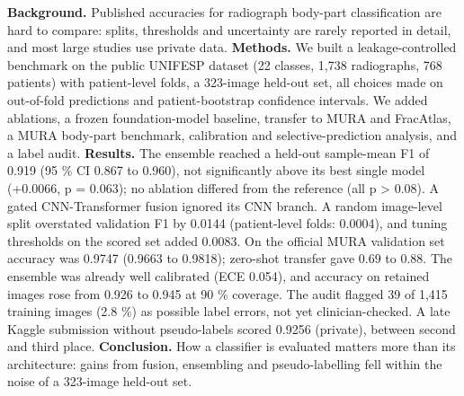 \textbf{Background.} Published accuracies for radiograph body-part classification are hard to compare: splits, thresholds and uncertainty are rarely reported in detail, and most large studies use private data.
\textbf{Methods.} We built a leakage-controlled benchmark on the public UNIFESP dataset (22 classes, 1,738 radiographs, 768 patients) with patient-level folds, a 323-image held-out set, all choices made on out-of-fold predictions and patient-bootstrap confidence intervals. We added ablations, a frozen foundation-model baseline, transfer to MURA and FracAtlas, a MURA body-part benchmark, calibration and selective-prediction analysis, and a label audit.
\textbf{Results.} The ensemble reached a held-out sample-mean F1 of 0.919 (95 \% CI 0.867 to 0.960), not significantly above its best single model (+0.0066, p = 0.063); no ablation differed from the reference (all p > 0.08). A gated CNN-Transformer fusion ignored its CNN branch. A random image-level split overstated validation F1 by 0.0144 (patient-level folds: 0.0004), and tuning thresholds on the scored set added 0.0083. On the official MURA validation set accuracy was 0.9747 (0.9663 to 0.9818); zero-shot transfer gave 0.69 to 0.88. The ensemble was already well calibrated (ECE 0.054), and accuracy on retained images rose from 0.926 to 0.945 at 90 \% coverage. The audit flagged 39 of 1,415 training images (2.8 \%) as possible label errors, not yet clinician-checked. A late Kaggle submission without pseudo-labels scored 0.9256 (private), between second and third place.
\textbf{Conclusion.} How a classifier is evaluated matters more than its architecture: gains from fusion, ensembling and pseudo-labelling fell within the noise of a 323-image held-out set.


